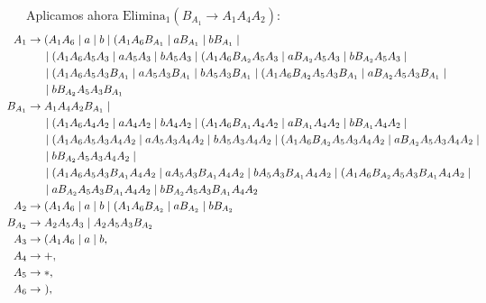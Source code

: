\documentclass[12pt]{article}
\begin{document}
\begin{ejercicio}[2.5 puntos]
\begin{description}
        Aplicamos ahora $\text{Elimina}_1(B_{A_1}\rightarrow A_1 A_4 A_2)$:
        \begin{align*}
            \hspace{-2.5cm}A_1 &\to (A_1 A_6 \mid a \mid b\mid (A_1 A_6 B_{A_1} \mid a B_{A_1} \mid b B_{A_1}
                \mid \\ & \hspace{0.5cm} \mid (A_1 A_6A_5A_3 \mid aA_5A_3 \mid bA_5A_3 \mid (A_1 A_6 B_{A_2}A_5A_3 \mid  a B_{A_2}A_5A_3 \mid  b B_{A_2}A_5A_3
                \mid \\ & \hspace{0.5cm} \mid (A_1 A_6 A_5 A_3 B_{A_1} \mid aA_5 A_3 B_{A_1} \mid bA_5 A_3 B_{A_1} \mid (A_1 A_6 B_{A_2}A_5 A_3 B_{A_1} \mid  a B_{A_2}A_5 A_3 B_{A_1} 
                \mid \\ & \hspace{0.5cm} \mid b B_{A_2}A_5 A_3 B_{A_1} \\
            \hspace{-2.5cm}B_{A_1} &\to A_1 A_4 A_2 B_{A_1}
                \mid \\ & \hspace{0.5cm} \mid (A_1 A_6 A_4 A_2 \mid aA_4 A_2 \mid bA_4 A_2\mid (A_1 A_6 B_{A_1}A_4 A_2 \mid a B_{A_1}A_4 A_2 \mid b B_{A_1}A_4 A_2
                \mid \\ & \hspace{0.5cm} \mid (A_1 A_6A_5A_3A_4 A_2 \mid aA_5A_3 A_4 A_2\mid bA_5A_3A_4 A_2 \mid (A_1 A_6 B_{A_2}A_5A_3 A_4 A_2\mid  a B_{A_2}A_5A_3A_4 A_2
                \mid \\ & \hspace{0.5cm} \mid b B_{A_2}A_5A_3A_4 A_2
                \mid \\ & \hspace{0.5cm} \mid (A_1 A_6 A_5 A_3 B_{A_1}A_4 A_2 \mid aA_5 A_3 B_{A_1}A_4 A_2 \mid bA_5 A_3 B_{A_1}A_4 A_2 \mid (A_1 A_6 B_{A_2}A_5 A_3 B_{A_1}A_4 A_2
                \mid \\ & \hspace{0.5cm} \mid  a B_{A_2}A_5 A_3 B_{A_1}A_4 A_2 \mid b B_{A_2}A_5 A_3 B_{A_1}A_4 A_2 \\
            \hspace{-2.5cm}A_2 &\to (A_1 A_6 \mid a \mid b \mid (A_1 A_6 B_{A_2} \mid  a B_{A_2} \mid  b B_{A_2} \\
            \hspace{-2.5cm}B_{A_2} & \to A_2 A_5 A_3 \mid A_2 A_5 A_3 B_{A_2}\\
            \hspace{-2.5cm}A_3 &\to (A_1 A_6 \mid a \mid b,\\
            \hspace{-2.5cm}A_4 &\to +,\\
            \hspace{-2.5cm}A_5 &\to *,\\
            \hspace{-2.5cm}A_6 &\to~),
        \end{align*}


\end{description}
\end{ejercicio}
\end{document}
